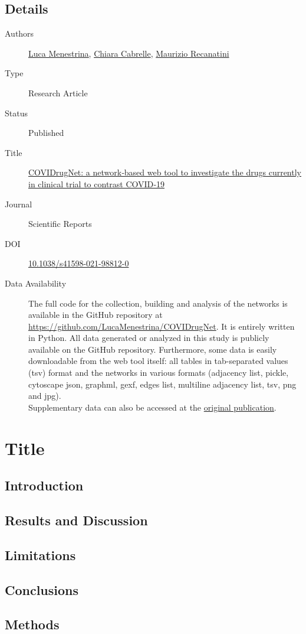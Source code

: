 \lorem[1]

\subsection*{Details}
\begin{description}
    \item[Authors] \href{http://orcid.org/0000-0002-3397-7737}{\underline{Luca Menestrina}}, \href{https://orcid.org/0000-0001-9518-5412}{Chiara Cabrelle}, \href{http://orcid.org/0000-0002-0039-0518}{Maurizio Recanatini}
    \item[Type] Research Article
    \item[Status] Published
    \item[Title] \href{https://www.nature.com/articles/s41598-021-98812-0}{COVIDrugNet: a network‑based web tool to investigate the drugs currently in clinical trial to contrast COVID‑19}
    \item[Journal] Scientific Reports
    \item[DOI] \href{http://doi.org/10.1038/s41598-021-98812-0}{10.1038/s41598-021-98812-0}
    \item[Data Availability] The full code for the collection, building and analysis of the networks is available in the GitHub repository at \url{https://github.com/LucaMenestrina/COVIDrugNet}. It is entirely written in Python. All data generated or analyzed in this study is publicly available on the GitHub repository. Furthermore, some data is easily downloadable from the web tool itself: all tables in tab-separated values (tsv) format and the networks in various formats (adjacency list, pickle, cytoscape json, graphml, gexf, edges list, multiline adjacency list, tsv, png and jpg).\\
    Supplementary data can also be accessed at the \href{https://www.nature.com/articles/s41598-021-98812-0#Sec19}{original publication}.
\end{description}
\clearpage

\section*{Title}


\subsection{Introduction}
    \lipsum[1-5]

\subsection{Results and Discussion}
    \lipsum[1-10]

\subsection{Limitations}
    \lipsum[1-2]

\subsection{Conclusions}
    \lipsum[1]

\subsection{Methods}
    \lipsum[1-8]